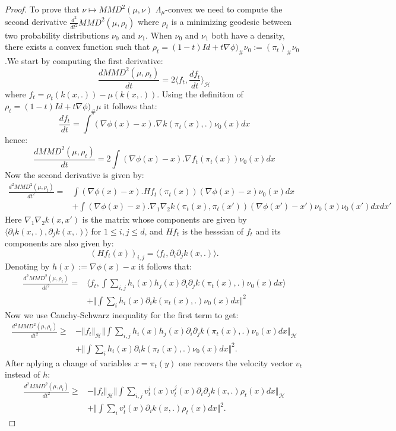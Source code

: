 \documentclass{article}
\newcommand{\1}{\mathbbm 1}
\theoremstyle{definition}
\begin{document}
\begin{proof}
To prove that $\nu\mapsto MMD^{2}(\mu,\nu)$ $\Lambda_{\mu}$-convex
we need to compute the second derivative $\frac{d^{2}}{dt^{2}}MMD^{2}(\mu,\rho_{t})$
where $\rho_{t}$ is a minimizing geodesic between two probability
distributions $\nu_{0}$ and $\nu_{1}$. When $\nu_{0}$ and $\nu_{1}$
both have a density, there exists a convex function such that $\rho_{t}=(1-t)Id+t\nabla\phi)_{\#}\nu_{0}:=(\pi_{t})_{\#}\nu_{0}$
.We start by computing the first derivative:
\[
\frac{dMMD^{2}(\mu,\rho_{t})}{dt}=2\langle f_{t},\frac{df_{t}}{dt}\rangle_{\mathcal{H}}
\]
where $f_{t}=\rho_{t}(k(x,.))-\mu(k(x,.))$. Using the definition
of $\rho_{t}=(1-t)Id+t\nabla\phi)_{\#}\mu$ it follows that:
\[
\frac{df_{t}}{dt}=\int(\nabla\phi(x)-x).\nabla k(\pi_{t}(x),.)\nu_{0}(x)dx
\]
hence:
\[
\frac{dMMD^{2}(\mu,\rho_{t})}{dt}=2\int(\nabla\phi(x)-x).\nabla f_{t}(\pi_{t}(x))\nu_{0}(x)dx
\]
Now the second derivative is given by:
\begin{align*}
\frac{d^{2}MMD^{2}(\mu,\rho_{t})}{dt^{2}}= & \int(\nabla\phi(x)-x).Hf_{t}(\pi_{t}(x))(\nabla\phi(x)-x)\nu_{0}(x)dx\\
 & +\int(\nabla\phi(x)-x).\nabla_{1}\nabla_{2}k(\pi_{t}(x),\pi_{t}(x'))(\nabla\phi(x')-x')\nu_{0}(x)\nu_{0}(x')dxdx'
\end{align*}
Here $\nabla_{1}\nabla_{2}k(x,x')$ is the matrix whose components
are given by $\langle\partial_{i}k(x,.),\partial_{j}k(x,.)\rangle$
for $1\leq i,j\leq d$, and $Hf_{t}$ is the hesssian of $f_{t}$
and its components are also given by:
\[
(Hf_{t}(x))_{i,j}=\langle f_{t},\partial_{i}\partial_{j}k(x,.)\rangle.
\]
Denoting by $h(x):=\nabla\phi(x)-x$ it follows that:
\begin{align*}
\frac{d^{2}MMD^{2}(\mu,\rho_{t})}{dt^{2}}= & \langle f_{t},\int\sum_{i,j}h_{i}(x)h_{j}(x)\partial_{i}\partial_{j}k(\pi_{t}(x),.)\nu_{0}(x)dx\rangle\\
 & +\Vert\int\sum_{i}h_{i}(x)\partial_{i}k(\pi_{t}(x),.)\nu_{0}(x)dx\Vert^{2}
\end{align*}
Now we use Cauchy-Schwarz inequality for the first term to get:
\begin{align*}
\frac{d^{2}MMD^{2}(\mu,\rho_{t})}{dt^{2}}\geq & -\Vert f_{t}\Vert_{\mathcal{H}}\Vert\int\sum_{i,j}h_{i}(x)h_{j}(x)\partial_{i}\partial_{j}k(\pi_{t}(x),.)\nu_{0}(x)dx\Vert_{\mathcal{H}}\\
 & +\Vert\int\sum_{i}h_{i}(x)\partial_{i}k(\pi_{t}(x),.)\nu_{0}(x)dx\Vert^{2}.
\end{align*}
After aplying a change of variables $x=\pi_{t}(y)$ one recovers the
velocity vector $v_{t}$ instead of $h$: 
\begin{align*}
\frac{d^{2}MMD^{2}(\mu,\rho_{t})}{dt^{2}}\geq & -\Vert f_{t}\Vert_{\mathcal{H}}\Vert\int\sum_{i,j}v_{t}^{i}(x)v_{t}^{j}(x)\partial_{i}\partial_{j}k(x,.)\rho_{t}(x)dx\Vert_{\mathcal{H}}\\
 & +\Vert\int\sum_{i}v_{t}^{i}(x)\partial_{i}k(x,.)\rho_{t}(x)dx\Vert^{2}.
\end{align*}


\end{proof}
\end{document}
